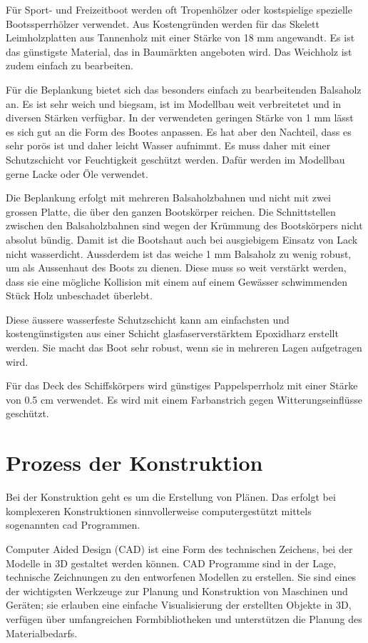 Für Sport- und Freizeitboot werden oft Tropenhölzer oder kostspielige spezielle Bootssperrhölzer verwendet. Aus Kostengründen werden für das Skelett Leimholzplatten aus Tannenholz mit einer Stärke von 18 mm angewandt. Es ist das günstigste Material, das in Baumärkten angeboten wird. Das Weichholz ist zudem einfach zu bearbeiten.

Für die Beplankung bietet sich das besonders einfach zu bearbeitenden Balsaholz an. Es ist sehr weich und biegsam, ist im Modellbau weit verbreitetet und in diversen Stärken verfügbar. In der verwendeten geringen Stärke von 1 mm lässt es sich gut an die Form des Bootes anpassen. Es hat aber den Nachteil, dass es sehr porös ist und daher leicht Wasser aufnimmt. Es muss daher mit einer Schutzschicht vor Feuchtigkeit geschützt werden. Dafür werden im Modellbau gerne Lacke oder Öle verwendet.

Die Beplankung erfolgt mit mehreren Balsaholzbahnen und nicht mit zwei grossen Platte, die über den ganzen Bootskörper reichen. Die Schnittstellen zwischen den Balsaholzbahnen sind wegen der Krümmung des Bootskörpers nicht absolut bündig. Damit ist die Bootshaut auch bei ausgiebigem Einsatz von Lack nicht wasserdicht. Aussderdem ist das weiche 1 mm Balsaholz zu wenig robust, um als Aussenhaut des Boots zu dienen. Diese muss so weit verstärkt werden, dass sie eine mögliche Kollision mit einem auf einem Gewässer schwimmenden Stück Holz unbeschadet überlebt.

Diese äussere wasserfeste Schutzschicht kann am einfachsten und kostengünstigsten aus einer Schicht glasfaserverstärktem Epoxidharz erstellt werden. Sie macht das Boot sehr robust, wenn sie in mehreren Lagen aufgetragen wird.

Für das Deck des Schiffskörpers wird günstiges Pappelsperrholz mit einer Stärke von 0.5 cm verwendet. Es wird mit einem Farbanstrich gegen Witterungseinflüsse geschützt.  

\section{Prozess der Konstruktion}
Bei der Konstruktion geht es um die Erstellung von Plänen. Das erfolgt bei komplexeren Konstruktionen sinnvollerweise computergestützt mittels sogenannten \ac{cad} Programmen. 

Computer Aided Design (CAD) ist eine Form des technischen Zeichens, bei der Modelle in 3D gestaltet werden können. CAD Programme sind in der Lage, technische Zeichnungen zu den entworfenen Modellen zu erstellen. Sie sind eines der wichtigsten Werkzeuge zur Planung und Konstruktion von Maschinen und Geräten; sie erlauben eine einfache Visualisierung der erstellten Objekte in 3D, verfügen über umfangreichen Formbibliotheken und unterstützen die Planung des Materialbedarfs.

